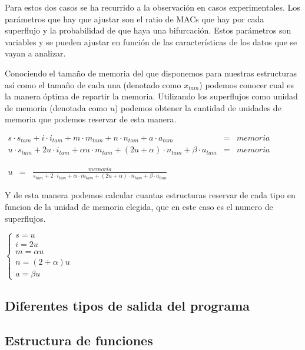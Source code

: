 \documentclass[twoside, 12pt]{epstfg}
\begin{document}
Para estos dos casos se ha recurrido a la observación en casos experimentales. Los parámetros que hay que ajustar son el ratio de MACs que hay por cada superflujo y la probabilidad de que haya una bifurcación. Estos parámetros son variables y se pueden ajustar en función de las características de los datos que se vayan a analizar.

Conociendo el tamaño de memoria del que disponemos para nuestras estructuras así como el tamaño de cada una (denotado como $x_{tam}$) podemos conocer cual es la manera óptima de repartir la memoria. Utilizando los superflujos como unidad de memoria (denotada como $u$) podemos obtener la cantidad de unidades de memoria que podemos reservar de esta manera.

$\begin{array}{lcl}
	s \cdot s_{tam} + i \cdot i_{tam} + m \cdot m_{tam} + n \cdot n_{tam} + a \cdot a_{tam} & = & memoria\\
	u \cdot s_{tam} + 2u \cdot i_{tam} + \alpha u \cdot m_{tam} + (2u+\alpha) \cdot n_{tam} + \beta \cdot a_{tam} & = & memoria
\end{array}$

$\begin{array}{lcl}
	u & = & \frac{memoria}{s_{tam} + 2 \cdot i_{tam} + \alpha \cdot m_{tam} + (2u+\alpha) \cdot n_{tam} + \beta \cdot a_{tam}}
\end{array}$

Y de esta manera podemos calcular cuantas estructuras reservar de cada tipo en funcion de la unidad de memoria elegida, que en este caso es el numero de superflujos.

$\begin{cases}
	s = u\\ 
	i = 2u\\ 
	m = \alpha u\\
	n = (2+\alpha)u\\
	a = \beta u
\end{cases}$

\subsection{Diferentes tipos de salida del programa}

\subsection{Estructura de funciones}
\end{document}
